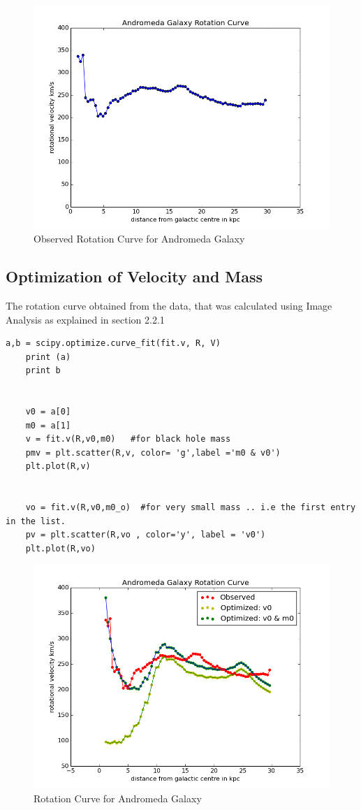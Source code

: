 \begin{figure} [h]
\centering
\includegraphics[scale=0.5]{rotcurve}
\caption{Observed Rotation Curve for Andromeda Galaxy}
\end{figure}
\subsection{Optimization of Velocity and Mass}
The rotation curve obtained from the data, that was calculated using Image Analysis as explained in section 2.2.1  

\begin{verbatim}
a,b = scipy.optimize.curve_fit(fit.v, R, V)
    print (a)
    print b


    v0 = a[0]
    m0 = a[1]
    v = fit.v(R,v0,m0)   #for black hole mass
    pmv = plt.scatter(R,v, color= 'g',label ='m0 & v0')
    plt.plot(R,v)


    vo = fit.v(R,v0,m0_o)  #for very small mass .. i.e the first entry in the list.
    pv = plt.scatter(R,vo , color='y', label = 'v0')
    plt.plot(R,vo)
\end{verbatim}

\begin{figure} [h]
\centering
\includegraphics[scale=0.5]{best}
\caption{Rotation Curve for Andromeda Galaxy}
\end{figure}


